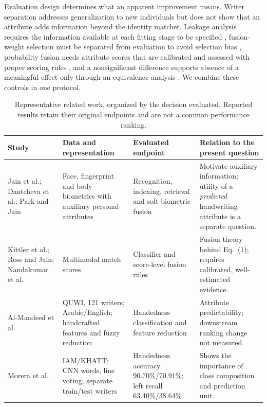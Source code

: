 \documentclass[ASNA,twocolumn]{USG}
\begin{document}
Evaluation design determines what an apparent improvement means. Writer separation addresses generalization to new individuals but does not show that an attribute adds information beyond the identity matcher. Leakage analysis requires the information available at each fitting stage to be specified \cite{kaufman2012leakage}, fusion-weight selection must be separated from evaluation to avoid selection bias \cite{varma2006bias,cawley2010selection}, probability fusion needs attribute scores that are calibrated and assessed with proper scoring rules \cite{gneiting2007scoring,guo2017calibration}, and a nonsignificant difference supports absence of a meaningful effect only through an equivalence analysis \cite{lakens2017equivalence}. We combine these controls in one protocol.

\begin{table}[!t]
\caption{Representative related work, organized by the decision evaluated. Reported results retain their original endpoints and are not a common performance ranking.}\label{tab:related}
\centering
\begin{tabularx}{\textwidth}{@{}>{\raggedright\arraybackslash}p{}>{\raggedright\arraybackslash}p{}>{\raggedright\arraybackslash}p{}>{\raggedright\arraybackslash}X@{}}\toprule
Study & Data and representation & Evaluated endpoint & Relation to the present question\\\midrule
Jain et al.; Dantcheva et al.; Park and Jain \cite{jain2004soft,jain2004integrating,dantcheva2011bag,dantcheva2016soft,park2010soft} & Face, fingerprint and body biometrics with auxiliary personal attributes & Recognition, indexing, retrieval and soft-biometric fusion & Motivate auxiliary information; utility of a \emph{predicted} handwriting attribute is a separate question.\\
Kittler et al.; Ross and Jain; Nandakumar et al.\ \cite{kittler1998combining,ross2003fusion,nandakumar2008likelihood} & Multimodal match scores & Classifier and score-level fusion rules & Fusion theory behind Eq.~(1); requires calibrated, well-estimated evidence.\\
Al-Maadeed et al.\ \cite{almaadeed2016handedness} & QUWI, 121 writers; Arabic/English; handcrafted features and fuzzy reduction & Handedness classification and feature reduction & Attribute predictability; downstream ranking change not measured.\\
Morera et al.\ \cite{morera2018handedness} & IAM/KHATT; CNN words, line voting; separate train/test writers & Handedness accuracy 90.70\%/70.91\%; left recall 63.40\%/38.64\% & Shows the importance of class composition and prediction unit.\\

\end{tabularx}
\end{table}
\end{document}
